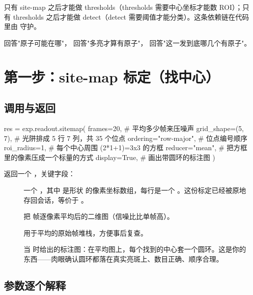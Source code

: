 \documentclass[11pt,oneside,openany]{book}
\begin{document}
只有 site-map 之后才能做 thresholds（thresholds 需要中心坐标才能数 ROI）；只有 thresholds 之后才能做 detect（detect 需要阈值才能分类）。这条依赖链在代码里由  守护。

\begin{notebox}[一句话记住流程]
 回答"原子可能在哪"， 回答"多亮才算有原子"， 回答"这一发到底哪几个有原子"。
\end{notebox}

\section{第一步：site-map 标定（找中心）}

\subsection{调用与返回}

\begin{codeblock}[Python]
res = exp.readout.sitemap(
    frames=20,            # 平均多少帧来压噪声
    grid_shape=(5, 7),    # 光阱排成 5 行 7 列，共 35 个位点
    ordering="row-major", # 位点编号顺序
    roi_radius=1,         # 每个中心周围 (2*1+1)=3x3 的方框
    reducer="mean",       # 把方框里的像素压成一个标量的方式
    display=True,         # 画出带圆环的标注图
)
\end{codeblock}

返回一个 ，关键字段：

\begin{description}
\item[] 一个 ，其中  是形状  的像素坐标数组，每行是一个 。这份标定已经被原地存回会话，等价于 。
\item[] 把  帧逐像素平均后的二维图（信噪比比单帧高）。
\item[] 用于平均的原始帧堆栈，方便事后复查。
\item[] 当  时给出的标注图：在平均图上，每个找到的中心套一个圆环。这是你的东西——肉眼确认圆环都落在真实亮斑上、数目正确、顺序合理。
\end{description}

\subsection{参数逐个解释}
\end{document}
